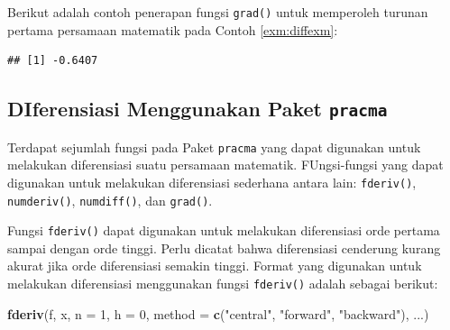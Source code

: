 \documentclass[
]{book}
\newenvironment{Shaded}{\begin{snugshade}}{\end{snugshade}}
\newcommand{\AttributeTok}[1]{\textcolor[rgb]{0.13,0.29,0.53}{#1}}
\newcommand{\ControlFlowTok}[1]{\textcolor[rgb]{0.13,0.29,0.53}{\textbf{#1}}}
\newcommand{\DecValTok}[1]{\textcolor[rgb]{0.00,0.00,0.81}{#1}}
\newcommand{\FunctionTok}[1]{\textcolor[rgb]{0.13,0.29,0.53}{\textbf{#1}}}
\newcommand{\NormalTok}[1]{#1}
\newcommand{\SpecialCharTok}[1]{\textcolor[rgb]{0.81,0.36,0.00}{\textbf{#1}}}
\newcommand{\StringTok}[1]{\textcolor[rgb]{0.31,0.60,0.02}{#1}}
\theoremstyle{definition}
\theoremstyle{definition}
\theoremstyle{definition}
\theoremstyle{definition}
\theoremstyle{remark}
\begin{document}
Berikut adalah contoh penerapan fungsi \texttt{grad()} untuk memperoleh turunan pertama persamaan matematik pada Contoh \ref{exm:diffexm}:

\begin{Shaded}
\end{Shaded}

\begin{verbatim}
## [1] -0.6407
\end{verbatim}

\hypertarget{diferensiasi-menggunakan-paket-pracma}{%
\subsection{\texorpdfstring{DIferensiasi Menggunakan Paket \texttt{pracma}}{DIferensiasi Menggunakan Paket pracma}}\label{diferensiasi-menggunakan-paket-pracma}}

Terdapat sejumlah fungsi pada Paket \texttt{pracma} yang dapat digunakan untuk melakukan diferensiasi suatu persamaan matematik. FUngsi-fungsi yang dapat digunakan untuk melakukan diferensiasi sederhana antara lain: \texttt{fderiv()}, \texttt{numderiv()}, \texttt{numdiff()}, dan \texttt{grad()}.

Fungsi \texttt{fderiv()} dapat digunakan untuk melakukan diferensiasi orde pertama sampai dengan orde tinggi. Perlu dicatat bahwa diferensiasi cenderung kurang akurat jika orde diferensiasi semakin tinggi. Format yang digunakan untuk melakukan diferensiasi menggunakan fungsi \texttt{fderiv()} adalah sebagai berikut:

\begin{Shaded}
\begin{Highlighting}[]
\FunctionTok{fderiv}\NormalTok{(f, x, }\AttributeTok{n =} \DecValTok{1}\NormalTok{, }\AttributeTok{h =} \DecValTok{0}\NormalTok{,}
        \AttributeTok{method =} \FunctionTok{c}\NormalTok{(}\StringTok{"central"}\NormalTok{, }\StringTok{"forward"}\NormalTok{, }\StringTok{"backward"}\NormalTok{), }
\NormalTok{       ...)}
\end{Highlighting}
\end{Shaded}
\end{document}
